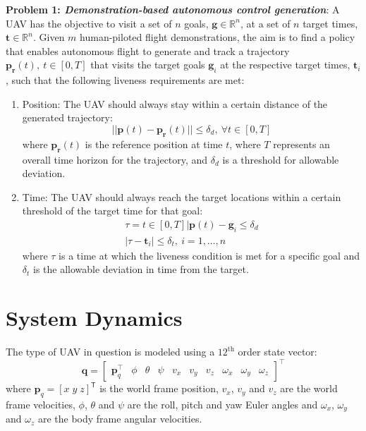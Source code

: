 \documentclass[letterpaper, 10 pt, conference]{ieeeconf}  %
\newcommand\NB[1]{$\spadesuit$\footnote{NB: #1}}
\begin{document}
\textbf{Problem 1: \textit{Demonstration-based autonomous control generation}}: A UAV has the objective to visit a set of $n$ goals, $\mathbf{g}\in\mathbb{R}^{n}$, at a set of $n$ target times, $\mathbf{t} \in\mathbb{R}^{n}$. Given $m$ human-piloted flight demonstrations, the aim is to find a policy that enables autonomous flight to generate and track a trajectory $\mathbf{p_r}(t),~ t \in [0,T]$ that visits the target goals $\mathbf{g}_i$ at the respective target times, $\mathbf{t}_i$, such that the following liveness requirements are met:
\begin{enumerate}
    \item  Position: The UAV should always stay within a certain distance of the generated trajectory:
    \begin{equation}
        ||\mathbf{p}(t)-\mathbf{p_r}(t)|| \leq \delta_d,~\forall t \in [0,T]
    \end{equation}
    where $\mathbf{p_r}(t)$ is the reference position at time $t$, where $T$ represents an overall time horizon for the trajectory, and $\delta_d$ is a threshold for allowable deviation.
    \item  Time: The UAV should always reach the target locations within a certain threshold of the target time for that goal:
    \begin{align}
        \tau = t\in[0,T]|\mathbf{p}(t)-\mathbf{g}_i \leq \delta_d \nonumber \\
        |\tau- \mathbf{t}_i| \leq \delta_t,~i=1,\ldots,n
    \end{align}
    where $\tau$ is a time at which the liveness condition is met for a specific goal and $\delta_t$ is the allowable deviation in time from the target.
\end{enumerate}


\section{System Dynamics}
The type of UAV in question is modeled using a $12^{\text{th}}$ order state vector:
\begin{equation}
    \mathbf{q} = 
    \begin{bmatrix}
    \mathbf{p}_q^\intercal & \phi & \theta & \psi & v_x & v_y & v_z & \omega_x & \omega_y & \omega_z
    \end{bmatrix}^\intercal \nonumber
\end{equation} %
where $\bm{p}_q=[x \; y \; z]^{\mathsf{T}}$ is the world frame position, $v_{x}$, $v_{y}$ and $v_z$ are the world frame velocities, $\phi$, $\theta$ and $\psi$ are the roll, pitch and yaw Euler angles and $\omega_{x}$, $\omega_{y}$ and $\omega_{z}$ are the body frame angular velocities.
\end{document}
